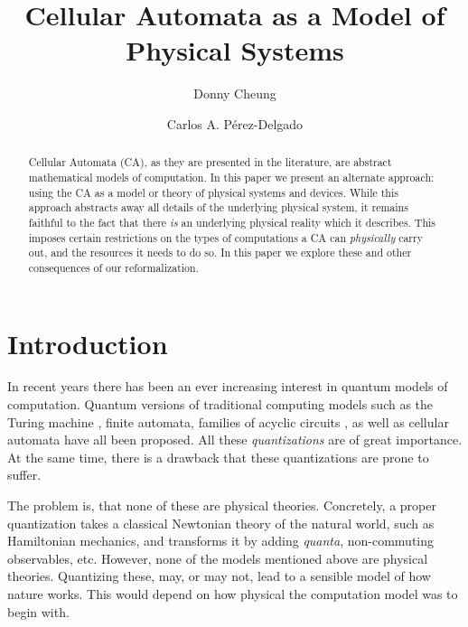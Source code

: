 \documentclass{jca}
\begin{document}
\title{Cellular Automata as a Model of Physical Systems}
\author{Donny Cheung \and Carlos A. P{\'e}rez-Delgado}

\maketitle

\begin{abstract}
Cellular Automata (CA), as they are presented in the literature, are abstract mathematical models of computation.
In this paper we present an alternate approach: using the CA as a model or theory of physical systems and devices. 
While this approach abstracts away all details of the underlying physical system, it remains faithful to the fact that there \emph{is} an underlying physical reality which it describes.
This imposes certain restrictions on the types of computations a CA can \emph{physically} carry out, and the resources it needs to do so.
In this paper we explore these and other consequences of our reformalization.
\end{abstract}

\section{Introduction}


In recent years there has been an ever increasing interest in quantum models of computation.
Quantum versions of traditional computing models such as the Turing machine \cite{deutsch85,bernstein1}, finite automata\cite{watrousqfa}, families of acyclic circuits \cite{yao}, as well as cellular automata \cite{sw04,watrous} have all been proposed.
All these \emph{quantizations} are of great importance. At the same time, there is a drawback that these quantizations are prone to suffer.

The problem is, that none of these are physical theories.
Concretely, a proper quantization takes a classical Newtonian theory of the natural world, such as Hamiltonian mechanics, and transforms it by adding \emph{quanta}, non-commuting observables, etc.
However, none of the models mentioned above are physical theories. Quantizing these, may, or may not, lead to a sensible model of how nature works.
This would depend on how physical the computation model was to begin with.
\end{document}

